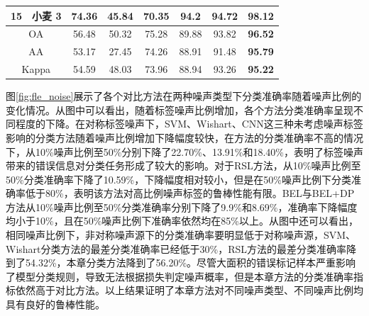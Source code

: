 \begin{table}[ht!]
\begin{tabular}{cccccccc}
        15                        & 小麦 3  & 74.36 & 45.84   & 70.35 & 94.2           & 94.72          & \textbf{98.12} \\
        \midrule[0.75bp]
        \multicolumn{2}{c}{OA}    & 56.48 & 50.32 & 75.28   & 89.88 & 93.82          & \textbf{96.52}                  \\
        \multicolumn{2}{c}{AA}    & 53.17 & 27.45 & 74.26   & 88.91 & 91.48          & \textbf{95.79}                  \\
        \multicolumn{2}{c}{Kappa} & 54.59 & 48.03 & 73.96   & 88.94 & 93.26          & \textbf{95.22}                  \\
        \bottomrule[1.5bp]
    \end{tabular}
\end{table}

图\ref{fig:fle_noise}展示了各个对比方法在两种噪声类型下分类准确率随着噪声比例的变化情况。从图中可以看出，随着标签噪声比例增加，各个方法分类准确率呈现不同程度的下降。在对称标签噪声下，SVM、Wishart、CNN这三种未考虑噪声标签影响的分类方法随着噪声比例增加下降幅度较快，在方法的分类准确率不高的情况下，从10\%噪声比例至50\%分别下降了22.70\%、13.91\%和18.40\%，表明了标签噪声带来的错误信息对分类任务形成了较大的影响。对于RSL方法，从10\%噪声比例至50\%分类准确率下降了10.59\%，下降幅度相对较小，但是在50\%噪声比例下分类准确率低于80\%，表明该方法对高比例噪声标签的鲁棒性能有限。BEL与BEL+DP方法从10\%噪声比例至50\%分类准确率分别下降了9.9\%和8.69\%，准确率下降幅度均小于10\%，且在50\%噪声比例下准确率依然均在85\%以上。从图中还可以看出，相同噪声比例下，非对称噪声源下的分类准确率要明显低于对称噪声源，SVM、Wishart分类方法的最差分类准确率已经低于30\%，RSL方法的最差分类准确率降到了54.32\%，本章分类方法降到了56.20\%。尽管大面积的错误标记样本严重影响了模型分类规则，导致无法根据损失判定噪声概率，但是本章方法的分类准确率指标依然高于对比方法。以上结果证明了本章方法对不同噪声类型、不同噪声比例均具有良好的鲁棒性能。

